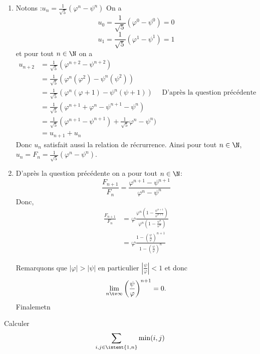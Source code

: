 \documentclass[a4paper, 11pt,reqno]{article}
\begin{document}
\begin{correction}
\begin{enumerate}
\item  Notons  :$u_n =\frac{1}{\sqrt{5}}(\varphi^n-\psi^n)$ 
On a 
$$u_0= \frac{1}{\sqrt{5}}(\varphi^0-\psi^0)=0$$
$$u_1= \frac{1}{\sqrt{5}}(\varphi^1-\psi^1)=1$$
et pour tout $n\in\N$ on a 
\begin{align*}
u_{n+2} &= \frac{1}{\sqrt{5}}(\varphi^{n+2}-\psi^{n+2}) \\
			&= \frac{1}{\sqrt{5}}(\varphi^n (\varphi^2)-\psi^n (\psi^2) ) \\
			&= \frac{1}{\sqrt{5}}(\varphi^n (\varphi +1)-\psi^n (\psi +1)  ) \quad \text{ D'après la question précédente} \\			
			&= \frac{1}{\sqrt{5}}(\varphi^{n+1} +\varphi^n-\psi^{n+1} -\psi^n   ) \\
			&= \frac{1}{\sqrt{5}}(\varphi^{n+1} -\psi^{n+1}) +  \frac{1}{\sqrt{5}} \varphi^n-\psi^n   ) \\
			&=u_{n+1}+u_n
\end{align*}
Donc $u_n$ satisfait aussi la relation de récrurrence. 
Ainsi  pour tout $n\in \N$, $u_n=F_n= \frac{1}{\sqrt{5}}(\varphi^n-\psi^n)$. 


\item D'après la question précédente on a pour tout $n\in \N$: 
$$\frac{F_{n+1}}{F_n} =  \frac{\varphi^{n+1}-\psi^{n+1}}{\varphi^n-\psi^n}$$
Donc,
\begin{align*}
\frac{F_{n+1}}{F_n} &=\varphi \frac{\varphi^{n}\left(1-\frac{\psi^{n+1}}{\varphi^{n+1}}\right)}{\varphi^n\left(1-\frac{\psi^n}{\varphi^n}\right)}\\
&=\varphi \frac{1-\left(\frac{\psi}{\varphi}\right)^{n+1}}{1-\left(\frac{\psi}{\varphi}\right)^n}
\end{align*}


Remarquons que $|\varphi| >|\psi|$ en particulier $|\frac{\psi}{\varphi}|<1$ et donc 
$$\lim_{n\tv \infty} \left(\frac{\psi}{\varphi}\right)^{n+1} =0.$$
Finalemetn 
\begin{center}
\end{center}

\end{enumerate}

\end{correction}




\begin{exercice}
Calculer 
$$\sum_{i,j \in \intent{1,n}} \min(i,j)$$

\end{exercice}
\end{document}
